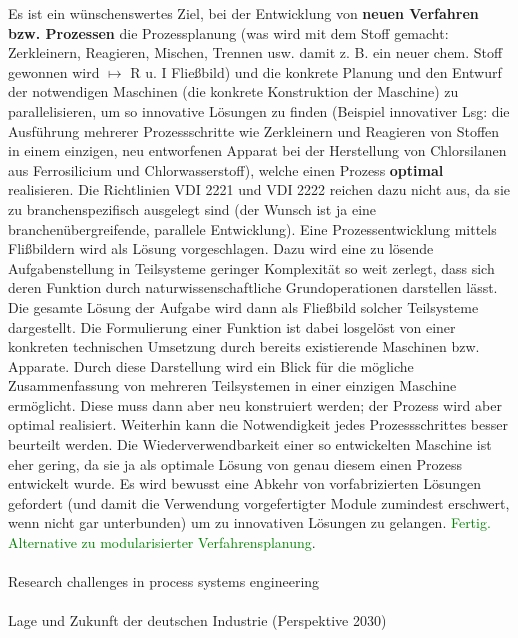 Es ist ein w\"unschenswertes Ziel, bei der Entwicklung von \textbf{neuen Verfahren bzw. Prozessen} die Prozessplanung (was wird mit dem Stoff gemacht: Zerkleinern, Reagieren, Mischen, Trennen usw. damit z. B. ein neuer chem. Stoff gewonnen wird $\mapsto$ R u. I Flie\ss{}bild) und die konkrete Planung und den Entwurf der notwendigen Maschinen (die konkrete Konstruktion der Maschine) zu parallelisieren, um so innovative L\"osungen zu finden (Beispiel innovativer Lsg: die Ausf\"uhrung mehrerer Prozessschritte wie Zerkleinern und Reagieren von Stoffen in einem einzigen, neu entworfenen Apparat bei der Herstellung von Chlorsilanen aus Ferrosilicium und Chlorwasserstoff), welche einen Prozess \textbf{optimal} realisieren. Die Richtlinien VDI 2221 und VDI 2222 reichen dazu nicht aus, da sie zu branchenspezifisch ausgelegt sind (der Wunsch ist ja eine branchen\"ubergreifende, parallele Entwicklung). Eine Prozessentwicklung mittels Fli\ss{}bildern wird als L\"osung vorgeschlagen. Dazu wird eine zu l\"osende Aufgabenstellung in Teilsysteme geringer Komplexit\"at so weit zerlegt, dass sich deren Funktion durch naturwissenschaftliche Grundoperationen darstellen l\"asst. Die gesamte L\"osung der Aufgabe wird dann als Flie\ss{}bild solcher Teilsysteme dargestellt. Die Formulierung einer Funktion  ist dabei losgel\"ost von einer konkreten technischen Umsetzung durch bereits existierende Maschinen bzw. Apparate. Durch diese Darstellung wird ein Blick f\"ur die m\"ogliche Zusammenfassung von mehreren Teilsystemen in einer einzigen Maschine erm\"oglicht. Diese muss dann aber neu konstruiert werden; der Prozess wird aber optimal realisiert. Weiterhin kann die  Notwendigkeit jedes Prozessschrittes besser beurteilt werden. Die Wiederverwendbarkeit einer so entwickelten Maschine ist eher gering, da sie ja als optimale L\"osung von genau diesem einen Prozess entwickelt wurde. Es wird bewusst eine Abkehr von vorfabrizierten L\"osungen gefordert (und damit die Verwendung vorgefertigter Module zumindest erschwert, wenn nicht gar unterbunden) um zu innovativen L\"osungen zu gelangen.
\textcolor{green}{Fertig. Alternative zu modularisierter Verfahrensplanung}.

\paragraph*{\cite{Grossmann_2000}} Research challenges in process systems engineering

\paragraph*{\cite{PerspektiveD_2016}} Lage und Zukunft der deutschen Industrie (Perspektive 2030)

